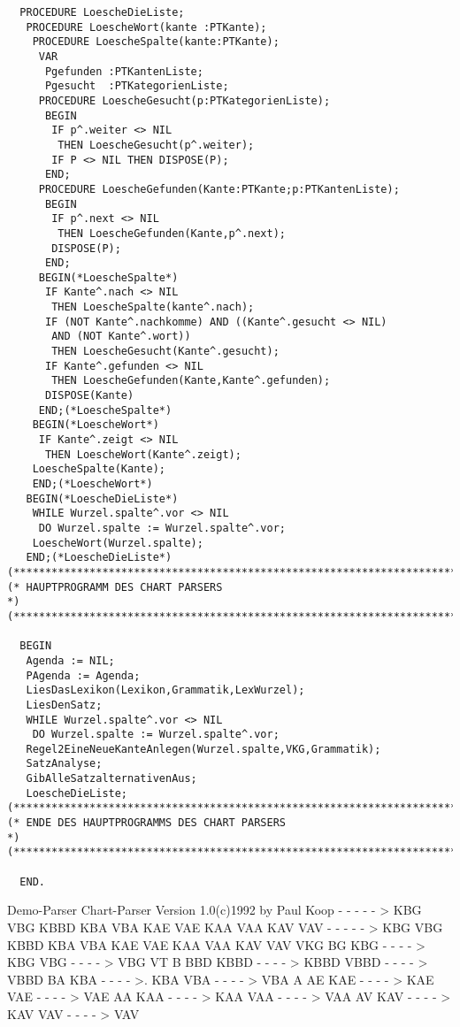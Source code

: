 \documentclass[12pt]{article}
\begin{document}
\begin{verbatim}
  PROCEDURE LoescheDieListe;
   PROCEDURE LoescheWort(kante :PTKante);
    PROCEDURE LoescheSpalte(kante:PTKante);
     VAR
      Pgefunden :PTKantenListe;
      Pgesucht  :PTKategorienListe;
     PROCEDURE LoescheGesucht(p:PTKategorienListe);
      BEGIN
       IF p^.weiter <> NIL
        THEN LoescheGesucht(p^.weiter);
       IF P <> NIL THEN DISPOSE(P);
      END;
     PROCEDURE LoescheGefunden(Kante:PTKante;p:PTKantenListe);
      BEGIN
       IF p^.next <> NIL
        THEN LoescheGefunden(Kante,p^.next);
       DISPOSE(P);
      END;
     BEGIN(*LoescheSpalte*)
      IF Kante^.nach <> NIL
       THEN LoescheSpalte(kante^.nach);
      IF (NOT Kante^.nachkomme) AND ((Kante^.gesucht <> NIL)
       AND (NOT Kante^.wort))
       THEN LoescheGesucht(Kante^.gesucht);
      IF Kante^.gefunden <> NIL
       THEN LoescheGefunden(Kante,Kante^.gefunden);
      DISPOSE(Kante)
     END;(*LoescheSpalte*)
    BEGIN(*LoescheWort*)
     IF Kante^.zeigt <> NIL
      THEN LoescheWort(Kante^.zeigt);
    LoescheSpalte(Kante);
    END;(*LoescheWort*)
   BEGIN(*LoescheDieListe*)
    WHILE Wurzel.spalte^.vor <> NIL
     DO Wurzel.spalte := Wurzel.spalte^.vor;
    LoescheWort(Wurzel.spalte);
   END;(*LoescheDieListe*)
(***************************************************************************)
(* HAUPTPROGRAMM DES CHART PARSERS                                         *)
(***************************************************************************)

  BEGIN
   Agenda := NIL;
   PAgenda := Agenda;
   LiesDasLexikon(Lexikon,Grammatik,LexWurzel);
   LiesDenSatz;
   WHILE Wurzel.spalte^.vor <> NIL
    DO Wurzel.spalte := Wurzel.spalte^.vor;
   Regel2EineNeueKanteAnlegen(Wurzel.spalte,VKG,Grammatik);
   SatzAnalyse;
   GibAlleSatzalternativenAus;
   LoescheDieListe;
(***************************************************************************)
(* ENDE DES HAUPTPROGRAMMS DES CHART PARSERS                               *)
(***************************************************************************)

  END.

\end{verbatim}

Demo-Parser Chart-Parser Version 1.0(c)1992 by Paul Koop
- - - - - > KBG VBG KBBD KBA VBA KAE VAE KAA VAA KAV VAV
- - - - - > KBG VBG KBBD KBA VBA KAE VAE KAA VAA KAV VAV
VKG
       BG
         KBG
- - - - >   KBG
         VBG
- - - - >  VBG
      VT
         B
            BBD                KBBD
 - - - - >  KBBD
              VBBD - - - - > VBBD
            BA
              KBA
- - - - >.  KBA
              VBA    - - - - >  VBA
         A                   AE             KAE  - - - - >  KAE
              VAE
- - - - >   VAE
            AA                              KAA  - - - - >  KAA
               VAA  - - - -  >  VAA
       AV               KAV - - - - > KAV
         VAV  - - - - >   VAV
\end{document}
